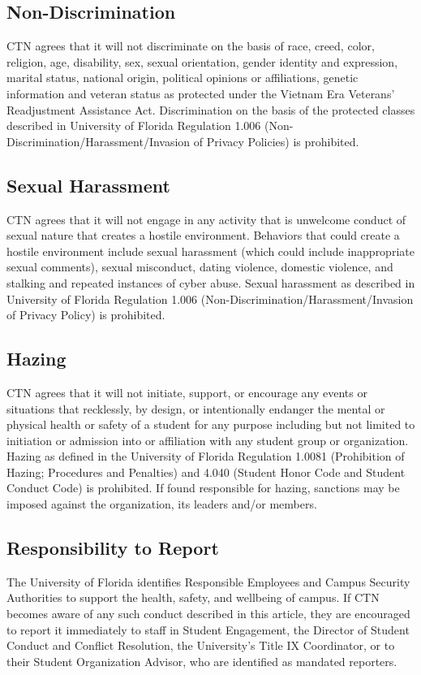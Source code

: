\documentclass{article}
\def\clubname{CTN }
\begin{document}
\subsection{Non-Discrimination}
\clubname agrees that it will not discriminate on the basis of race, creed, color, religion, age, disability, sex, sexual orientation, gender identity and expression, marital status, national origin, political opinions or affiliations, genetic information and veteran status as protected under the Vietnam Era Veterans' Readjustment Assistance Act. Discrimination on the basis of the protected classes described in University of Florida Regulation 1.006 (Non-Discrimination/Harassment/Invasion of Privacy Policies) is prohibited.

\subsection{Sexual Harassment}

\clubname agrees that it will not engage in any activity that is unwelcome conduct of sexual nature that creates a hostile environment. Behaviors that could create a hostile environment include sexual harassment (which could include inappropriate sexual comments), sexual misconduct, dating violence, domestic violence, and stalking and repeated instances of cyber abuse. Sexual harassment as described in University of Florida Regulation 1.006 (Non-Discrimination/Harassment/Invasion of Privacy Policy) is prohibited.

\subsection{Hazing}
\clubname agrees that it will not initiate, support, or encourage any events or situations that recklessly, by design, or intentionally endanger the mental or physical health or safety of a student for any purpose including but not limited to initiation or admission into or affiliation with any student group or organization. Hazing as defined in the University of Florida Regulation 1.0081 (Prohibition of Hazing; Procedures and Penalties) and 4.040 (Student Honor Code and Student Conduct Code) is prohibited. If found responsible for hazing, sanctions may be imposed against the organization, its leaders and/or members.

\subsection{Responsibility to Report}
The University of Florida identifies Responsible Employees and Campus Security Authorities to support the health, safety, and wellbeing of campus. If \clubname becomes aware of any such conduct described in this article, they are encouraged to report it immediately to staff in Student Engagement, the Director of Student Conduct and Conflict Resolution, the University’s Title IX Coordinator, or to their Student Organization Advisor, who are identified as mandated reporters.
\end{document}
